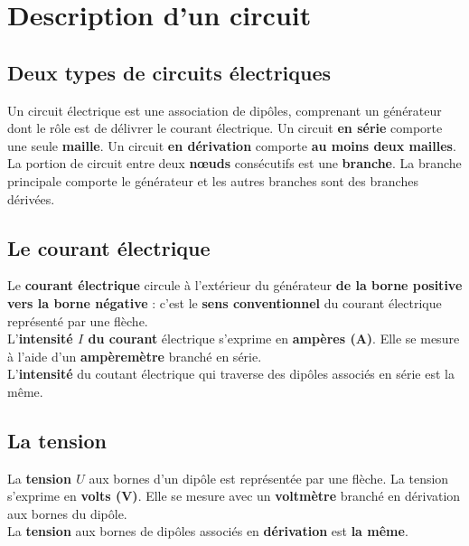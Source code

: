 \documentclass[a4paper,11pt,fleqn]{article}%
\begin{document}
\maketitle

\section{Description d'un circuit}
\subsection{Deux types de circuits électriques}
Un circuit électrique est une association de dipôles, comprenant un générateur dont le rôle est de délivrer le courant électrique. Un circuit \textbf{en série} comporte une seule \textbf{maille}. Un circuit \textbf{en dérivation} comporte \textbf{au moins deux mailles}.\\
La portion de circuit entre deux \textbf{nœuds} consécutifs est une \textbf{branche}. La branche principale comporte le générateur et les autres branches sont des branches dérivées.

\vspace{3cm}

\subsection{Le courant électrique}
Le \textbf{courant électrique} circule à l'extérieur du générateur \textbf{de la borne positive vers la borne négative} : c'est le \textbf{sens conventionnel} du courant électrique représenté par une flèche.\\
L'\textbf{intensité $I$ du courant} électrique s'exprime en \textbf{ampères (A)}. Elle se mesure à l'aide d'un \textbf{ampèremètre} branché en série.\\
L'\textbf{intensité} du coutant électrique qui traverse des dipôles associés en série est la même.

\subsection{La tension}
La \textbf{tension $U$} aux bornes d'un dipôle est représentée par une flèche. La tension s'exprime en \textbf{volts (V)}. Elle se mesure avec un \textbf{voltmètre} branché en dérivation aux bornes du dipôle.\\
La \textbf{tension} aux bornes de dipôles associés en \textbf{dérivation} est \textbf{la même}.

\vspace{3cm}
\end{document}
